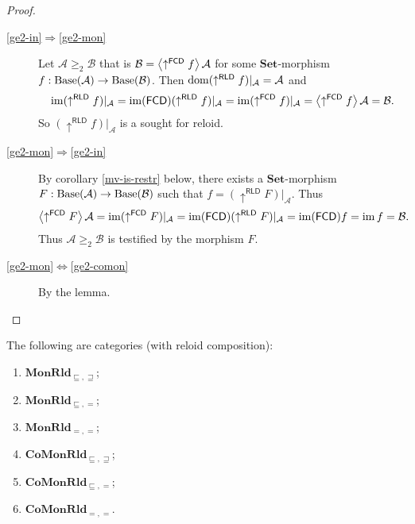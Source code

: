\begin{proof}
~
\begin{description}
\item [{\ref{ge2-in}$\Rightarrow$\ref{ge2-mon}}] Let $\mathcal{A}\ge_{2}\mathcal{B}$
that is $\mathcal{B}=\left\langle \uparrow^{\mathsf{FCD}}f\right\rangle\mathcal{A}$
for some $\mathbf{Set}$-morphism $f:\operatorname{Base}(\mathcal{A})\rightarrow\operatorname{Base}(\mathcal{B})$.
Then $\operatorname{dom}(\uparrow^{\mathsf{RLD}}f)|_{\mathcal{A}}=\mathcal{A}$
and 
\[
\operatorname{im}(\uparrow^{\mathsf{RLD}}f)|_{\mathcal{A}}=\operatorname{im}(\mathsf{FCD})(\uparrow^{\mathsf{RLD}}f)|_{\mathcal{A}}=\operatorname{im}(\uparrow^{\mathsf{FCD}}f)|_{\mathcal{A}}=\left\langle \uparrow^{\mathsf{FCD}}f\right\rangle\mathcal{A}=\mathcal{B}.
\]
So $(\uparrow^{\mathsf{RLD}}f)|_{\mathcal{A}}$ is a sought for reloid.
\item [{\ref{ge2-mon}$\Rightarrow$\ref{ge2-in}}] By corollary \ref{mv-is-restr}
below, there exists a $\mathbf{Set}$-morphism $F:\operatorname{Base}(\mathcal{A})\rightarrow\operatorname{Base}(\mathcal{B})$
such that $f=(\uparrow^{\mathsf{RLD}}F)|_{\mathcal{A}}$. Thus
\[
\left\langle \uparrow^{\mathsf{FCD}}F\right\rangle\mathcal{A}=\operatorname{im}(\uparrow^{\mathsf{FCD}}F)|_{\mathcal{A}}=\operatorname{im}(\mathsf{FCD})(\uparrow^{\mathsf{RLD}}F)|_{\mathcal{A}}=\operatorname{im}(\mathsf{FCD}) f=\operatorname{im} f=\mathcal{B}.
\]
Thus $\mathcal{A}\ge_{2}\mathcal{B}$ is testified by the morphism
$F$.
\item [{\ref{ge2-mon}$\Leftrightarrow$\ref{ge2-comon}}] By the lemma.
\end{description}
\end{proof}
\begin{thm}
The following are categories (with reloid composition):
\begin{enumerate}
\item \label{monrld-le-ge}$\mathbf{MonRld}_{\sqsubseteq,\sqsupseteq}$;
\item \label{monrld-le-eq}$\mathbf{MonRld}_{\sqsubseteq,=}$;
\item \label{monrld-eq-eq}$\mathbf{MonRld}_{=,=}$;
\item $\mathbf{CoMonRld}_{\sqsubseteq,\sqsupseteq}$;
\item $\mathbf{CoMonRld}_{\sqsubseteq,=}$;
\item $\mathbf{CoMonRld}_{=,=}$.
\end{enumerate}
\end{thm}
